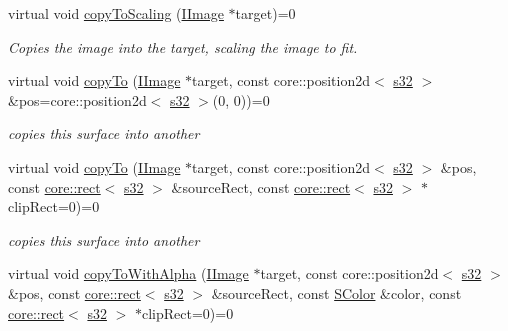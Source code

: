 \begin{DoxyCompactItemize}
\mbox{\label{classirr_1_1video_1_1IImage_aa969bf7167171a18003e26ff7876febd}} 
virtual void \hyperlink{classirr_1_1video_1_1IImage_aa969bf7167171a18003e26ff7876febd}{copy\+To\+Scaling} (\hyperlink{classirr_1_1video_1_1IImage}{I\+Image} $\ast$target)=0
\begin{DoxyCompactList}\small\item\em Copies the image into the target, scaling the image to fit. \end{DoxyCompactList}\item 
\mbox{\label{classirr_1_1video_1_1IImage_ae4a8a2fc245f691224825aceffd53b8a}} 
virtual void \hyperlink{classirr_1_1video_1_1IImage_ae4a8a2fc245f691224825aceffd53b8a}{copy\+To} (\hyperlink{classirr_1_1video_1_1IImage}{I\+Image} $\ast$target, const core\+::position2d$<$ \hyperlink{namespaceirr_ac66849b7a6ed16e30ebede579f9b47c6}{s32} $>$ \&pos=core\+::position2d$<$ \hyperlink{namespaceirr_ac66849b7a6ed16e30ebede579f9b47c6}{s32} $>$(0, 0))=0
\begin{DoxyCompactList}\small\item\em copies this surface into another \end{DoxyCompactList}\item 
\mbox{\label{classirr_1_1video_1_1IImage_ac43f477f9da28077fc3573a628b33bcb}} 
virtual void \hyperlink{classirr_1_1video_1_1IImage_ac43f477f9da28077fc3573a628b33bcb}{copy\+To} (\hyperlink{classirr_1_1video_1_1IImage}{I\+Image} $\ast$target, const core\+::position2d$<$ \hyperlink{namespaceirr_ac66849b7a6ed16e30ebede579f9b47c6}{s32} $>$ \&pos, const \hyperlink{classirr_1_1core_1_1rect}{core\+::rect}$<$ \hyperlink{namespaceirr_ac66849b7a6ed16e30ebede579f9b47c6}{s32} $>$ \&source\+Rect, const \hyperlink{classirr_1_1core_1_1rect}{core\+::rect}$<$ \hyperlink{namespaceirr_ac66849b7a6ed16e30ebede579f9b47c6}{s32} $>$ $\ast$clip\+Rect=0)=0
\begin{DoxyCompactList}\small\item\em copies this surface into another \end{DoxyCompactList}\item 
\mbox{\label{classirr_1_1video_1_1IImage_a7dd1e5dd19cb35be17c2fa00e38a193d}} 
virtual void \hyperlink{classirr_1_1video_1_1IImage_a7dd1e5dd19cb35be17c2fa00e38a193d}{copy\+To\+With\+Alpha} (\hyperlink{classirr_1_1video_1_1IImage}{I\+Image} $\ast$target, const core\+::position2d$<$ \hyperlink{namespaceirr_ac66849b7a6ed16e30ebede579f9b47c6}{s32} $>$ \&pos, const \hyperlink{classirr_1_1core_1_1rect}{core\+::rect}$<$ \hyperlink{namespaceirr_ac66849b7a6ed16e30ebede579f9b47c6}{s32} $>$ \&source\+Rect, const \hyperlink{classirr_1_1video_1_1SColor}{S\+Color} \&color, const \hyperlink{classirr_1_1core_1_1rect}{core\+::rect}$<$ \hyperlink{namespaceirr_ac66849b7a6ed16e30ebede579f9b47c6}{s32} $>$ $\ast$clip\+Rect=0)=0

\end{DoxyCompactItemize}
